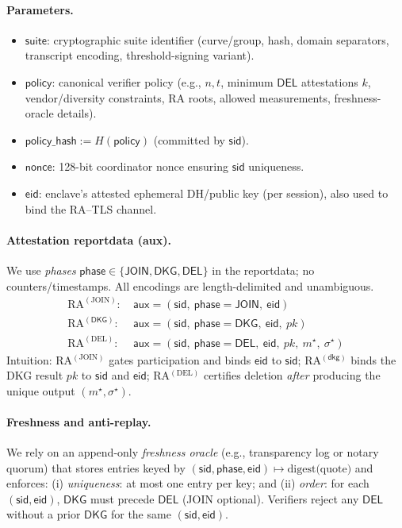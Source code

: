 \documentclass[runningheads,orivec]{llncs}
\begin{document}
\paragraph{Parameters.}
\begin{itemize}[leftmargin=*,itemsep=0.25em]
  \item $\mathsf{suite}$: cryptographic suite identifier (curve/group, hash, domain separators, transcript encoding, threshold-signing variant).
  \item $\mathsf{policy}$: canonical verifier policy (e.g., $n,t$, minimum $\mathsf{DEL}$ attestations $k$, vendor/diversity constraints, RA roots, allowed measurements, freshness-oracle details).
  \item $\mathsf{policy\_hash} := H(\mathsf{policy})$ (committed by $\mathsf{sid}$).
  \item $\mathsf{nonce}$: 128-bit coordinator nonce ensuring $\mathsf{sid}$ uniqueness.
  \item $\mathsf{eid}$: enclave’s attested ephemeral DH/public key (per session), also used to bind the RA–TLS channel.
\end{itemize}

\paragraph{Attestation reportdata (aux).}
We use \emph{phases} $\mathsf{phase}\in\{\mathsf{JOIN},\mathsf{DKG},\mathsf{DEL}\}$ in the reportdata; no counters/timestamps.
All encodings are length-delimited and unambiguous.
\begin{align*}
  \text{RA}^{(\mathrm{JOIN})}\!:\ & \mathsf{aux} = (\mathsf{sid},\ \mathsf{phase}=\mathsf{JOIN},\ \mathsf{eid}) \\
  \text{RA}^{(\mathsf{DKG})}\!:\ & \mathsf{aux} = (\mathsf{sid},\ \mathsf{phase}=\mathsf{DKG},\ \mathsf{eid},\ pk) \\
  \text{RA}^{(\mathrm{DEL})}\!:\ & \mathsf{aux} = (\mathsf{sid},\ \mathsf{phase}=\mathsf{DEL},\ \mathsf{eid},\ pk,\ m^{\star},\ \sigma^{\star})
\end{align*}
Intuition: RA$^{(\mathrm{JOIN})}$ gates participation and binds $\mathsf{eid}$ to $\mathsf{sid}$; RA$^{(\mathsf{dkg})}$ binds the DKG result $pk$ to $\mathsf{sid}$ and $\mathsf{eid}$;
RA$^{(\mathrm{DEL})}$ certifies deletion \emph{after} producing the unique output $(m^{\star},\sigma^{\star})$.

\paragraph{Freshness and anti-replay.}
We rely on an append-only \emph{freshness oracle} (e.g., transparency log or notary quorum) that stores
entries keyed by $(\mathsf{sid},\mathsf{phase},\mathsf{eid}) \mapsto \text{digest(quote)}$ and enforces:
(i) \emph{uniqueness}: at most one entry per key; and
(ii) \emph{order}: for each $(\mathsf{sid},\mathsf{eid})$, $\mathsf{DKG}$ must precede $\mathsf{DEL}$ (JOIN optional).
Verifiers reject any $\mathsf{DEL}$ without a prior $\mathsf{DKG}$ for the same $(\mathsf{sid},\mathsf{eid})$.
\end{document}
